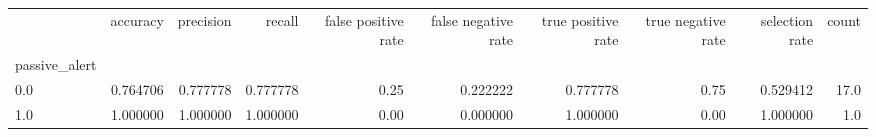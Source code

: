 \begin{tabular}{lrrrrrrrrr}
\toprule
{} &  accuracy &  precision &    recall &  false positive rate &  false negative rate &  true positive rate &  true negative rate &  selection rate &  count \\
passive\_alert &           &            &           &                      &                      &                     &                     &                 &        \\
\midrule
0.0           &  0.764706 &   0.777778 &  0.777778 &                 0.25 &             0.222222 &            0.777778 &                0.75 &        0.529412 &   17.0 \\
1.0           &  1.000000 &   1.000000 &  1.000000 &                 0.00 &             0.000000 &            1.000000 &                0.00 &        1.000000 &    1.0 \\
\bottomrule
\end{tabular}
